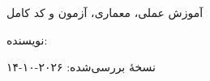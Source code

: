 \begin{titlepage}
\thispagestyle{plain}
\centering
\vspace*{18mm}
{\color{accent}\Huge\bfseries\ReportTitle\par}
\vspace{8mm}
{\Large آموزش عملی، معماری، آزمون و کد کامل\par}
\vspace{18mm}
{\Large نویسنده: \AuthorName\par}
\vfill
{\large نسخهٔ بررسی‌شده: ۲۰۲۶-۱۰-۱۴\par}
\vspace{10mm}
{\ContactHeading\par}
\medskip
\ContactRows
\vspace{14mm}
\end{titlepage}

